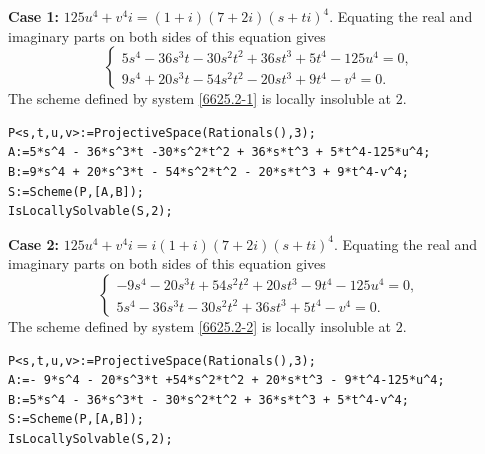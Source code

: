 \documentclass[a4paper,12pt,english,reqno]{amsart}
\begin{document}
{\bf Case 1:} $125u^4+v^4i=(1+i)(7+2i)(s+ti)^4$. Equating the real and imaginary parts on both sides of this equation gives
\begin{equation}\label{6625.2-1}
\begin{cases}
5s^4 - 36s^3t - 30s^2t^2 + 36st^3 + 5t^4 - 125u^4=0,\\
9s^4 + 20s^3t - 54s^2t^2 - 20st^3 + 9t^4 - v^4=0.
\end{cases}
\end{equation}
The scheme defined by system \eqref{6625.2-1} is locally insoluble at $2$.

\begin{lstlisting}
P<s,t,u,v>:=ProjectiveSpace(Rationals(),3);
A:=5*s^4 - 36*s^3*t -30*s^2*t^2 + 36*s*t^3 + 5*t^4-125*u^4;
B:=9*s^4 + 20*s^3*t - 54*s^2*t^2 - 20*s*t^3 + 9*t^4-v^4;
S:=Scheme(P,[A,B]);
IsLocallySolvable(S,2);
\end{lstlisting}

{\bf Case 2:} $125u^4+v^4i=i(1+i)(7+2i)(s+ti)^4$.  Equating the real and imaginary parts on both sides of this equation gives
\begin{equation}\label{6625.2-2}
\begin{cases}
-9s^4 - 20s^3t + 54s^2t^2 + 20st^3 - 9t^4 - 125u^4=0,\\
5s^4 - 36s^3t - 30s^2t^2 + 36st^3 + 5t^4 - v^4=0.
\end{cases}
\end{equation}
The scheme defined by system \eqref{6625.2-2} is locally insoluble at $2$.

\begin{lstlisting}
P<s,t,u,v>:=ProjectiveSpace(Rationals(),3);
A:=- 9*s^4 - 20*s^3*t +54*s^2*t^2 + 20*s*t^3 - 9*t^4-125*u^4;
B:=5*s^4 - 36*s^3*t - 30*s^2*t^2 + 36*s*t^3 + 5*t^4-v^4;
S:=Scheme(P,[A,B]);
IsLocallySolvable(S,2);
\end{lstlisting}
\end{document}
